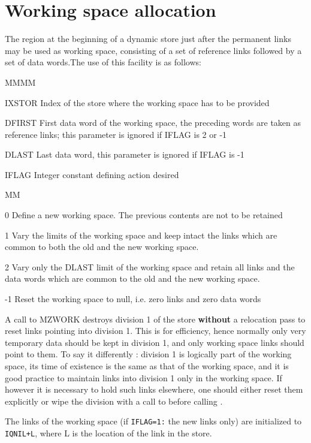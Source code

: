 \section{Working space allocation}
\par The region at the beginning of a dynamic store just after
the permanent links may be used as working space,
consisting of a set of reference links followed by
a set of data words.The use of this facility is as follows:
\Idesc
\begin{DL}{MMMM}
\item[IXSTOR]Index of the store where the working space has to be provided
\item[DFIRST]First data word of the working space,
the preceding words are taken as reference links;
this parameter is ignored if IFLAG is 2 or -1
\item[DLAST]Last data word,
this parameter is ignored if IFLAG is -1
\item[IFLAG]Integer constant defining action desired
\begin{DL}{MM}
\item[ 0]Define a new working space.
The previous contents are not to be retained
\item[ 1]Vary the limits of the working space and keep
intact the links which are common to
both the old and the new working space.
\item[ 2]Vary only the DLAST limit of the working space and retain
all links and the data words
which are common to the old and the new working space.
\item[-1]Reset the working space to null,
i.e. zero links and zero data words
\end{DL}
\end{DL}
\par A call to MZWORK destroys division 1 of the store
{\bf without}
a relocation pass to reset links pointing into division 1.
This is for efficiency,
hence normally only very temporary data should be kept in division 1,
and only working space links should point to them.
To say it differently : division 1 is logically part of the
working space,
its time of existence is the same as that of the working space,
and it is good practice to maintain links into division 1
only in the working space.
If however it is necessary to hold such links elsewhere,
one should either reset them explicitly or wipe the division with
a call to  before calling .
\par The links of the working space (if {\tt IFLAG=1:} the new links only)
are initialized to  {\tt IQNIL+L},
where L is the location of the link in the store.
